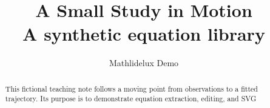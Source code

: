 \documentclass[11pt]{article}
\title{A Small Study in Motion\\[0.3em]\large A synthetic equation library}
\author{Mathlidelux Demo}
\date{}
\begin{document}
\maketitle
\begin{abstract}
This fictional teaching note follows a moving point from observations to a fitted
trajectory. Its purpose is to demonstrate equation extraction, editing, and SVG

\end{abstract}





\end{document}
